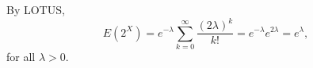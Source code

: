 
\setcounter{theorem}{61}
\begin{exercise} [BH.4.62]
\begin{solution}
    By LOTUS,
    $$
    E\left(2^X\right)=e^{-\lambda} \sum_{k=0}^{\infty} \frac{(2 \lambda)^k}{k !}=e^{-\lambda} e^{2 \lambda}=e^\lambda,
    $$
    for all $\lambda>0$.
\end{solution}
\end{exercise}

